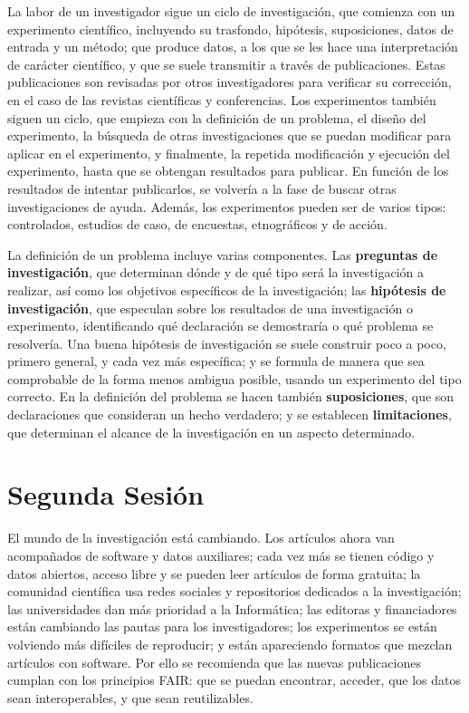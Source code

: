 \documentclass{article}
\begin{document}
La labor de un investigador sigue un ciclo de investigación, que comienza con un experimento científico, incluyendo su trasfondo, hipótesis, suposiciones, datos de entrada y un método; que produce datos, a los que se les hace una interpretación de carácter científico, y que se suele transmitir a través de publicaciones. Estas publicaciones son revisadas por otros investigadores para verificar su corrección, en el caso de las revistas científicas y conferencias. Los experimentos también siguen un ciclo, que empieza con la definición de un problema, el diseño del experimento, la búsqueda de otras investigaciones que se puedan modificar para aplicar en el experimento, y finalmente, la repetida modificación y ejecución del experimento, hasta que se obtengan resultados para publicar. En función de los resultados de intentar publicarlos, se volvería a la fase de buscar otras investigaciones de ayuda. Además, los experimentos pueden ser de varios tipos: controlados, estudios de caso, de encuestas, etnográficos y de acción. 

La definición de un problema incluye varias componentes. Las \textbf{preguntas de investigación}, que determinan dónde y de qué tipo será la investigación a realizar, así como los objetivos específicos de la investigación; las \textbf{hipótesis de investigación}, que especulan sobre los resultados de una investigación o experimento, identificando qué declaración se demostraría o qué problema se resolvería. Una buena hipótesis de investigación se suele construir poco a poco, primero general, y cada vez más específica; y se formula de manera que sea comprobable de la forma menos ambigua posible, usando un experimento del tipo correcto. En la definición del problema se hacen también \textbf{suposiciones}, que son declaraciones que consideran un hecho verdadero; y se establecen \textbf{limitaciones}, que determinan el alcance de la investigación en un aspecto determinado.

\section{Segunda Sesión}

El mundo de la investigación está cambiando. Los artículos ahora van acompañados de software y datos auxiliares; cada vez más se tienen código y datos abiertos, acceso libre y se pueden leer artículos de forma gratuita; la comunidad científica usa redes sociales y repositorios dedicados a la investigación; las universidades dan más prioridad a la Informática; las editoras y financiadores están cambiando las pautas para los investigadores; los experimentos se están volviendo más difíciles de reproducir; y están apareciendo formatos que mezclan artículos con software. Por ello se recomienda que las nuevas publicaciones cumplan con los principios FAIR: que se puedan encontrar, acceder, que los datos sean interoperables, y que sean reutilizables.
\end{document}
